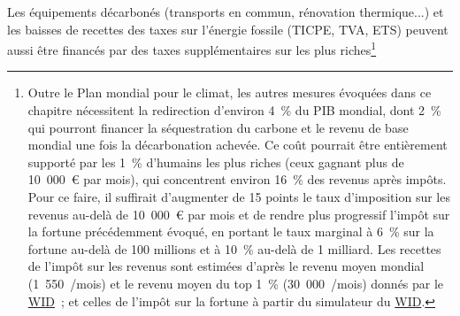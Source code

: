 \documentclass[a5paper,french,openany]{memoir}
\begin{document}
Les équipements décarbonés (transports en commun, rénovation thermique...) et les baisses de recettes des taxes sur l'énergie fossile (TICPE, TVA, ETS) peuvent aussi être financés par des taxes supplémentaires sur les plus riches\footnote{Outre le Plan mondial pour le climat, les autres mesures évoquées dans ce chapitre nécessitent la redirection d'environ 4~\% du PIB mondial, dont 2~\% qui pourront financer la séquestration du carbone et le revenu de base mondial une fois la décarbonation achevée. %
Ce coût pourrait être entièrement supporté par les 1~\% d'humains les plus riches (ceux gagnant plus de 10~000~\euro{} par mois), qui concentrent environ 16~\% des revenus après impôts. Pour ce faire, il suffirait d'augmenter de 15 points le taux d'imposition sur les revenus au-delà de 10~000~\euro{} par mois et de rendre plus progressif l'impôt sur la fortune précédemment évoqué, en portant le taux marginal à 6~\% sur la fortune au-delà de 100 millions et à 10~\% au-delà de 1 milliard. Les recettes de l'impôt sur les revenus sont estimées d'après le revenu moyen mondial (1~550~\textit{\texteuro{}}/mois) et le revenu moyen du top 1~\% (30~000~\textit{\texteuro{}}/mois) donnés par le \href{https://wid.world/data/}{WID}~; et celles de l'impôt sur la fortune à partir du simulateur du \href{https://wid.world/world-wealth-tax-simulator/}{WID}.
}
\end{document}
